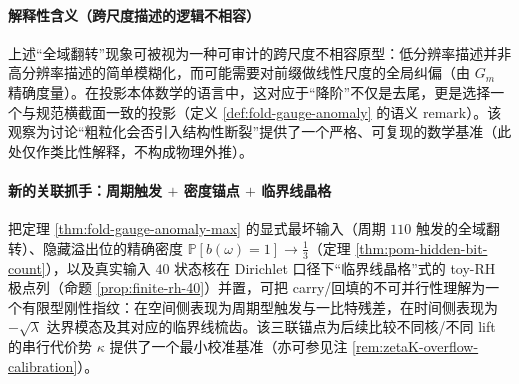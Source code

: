 \paragraph{解释性含义（跨尺度描述的逻辑不相容）}
上述“全域翻转”现象可被视为一种可审计的跨尺度不相容原型：低分辨率描述并非高分辨率描述的简单模糊化，而可能需要对前缀做线性尺度的全局纠偏（由 \(G_m\) 精确度量）。在投影本体数学的语言中，这对应于“降阶”不仅是去尾，更是选择一个与规范横截面一致的投影（定义 \ref{def:fold-gauge-anomaly} 的语义 remark）。该观察为讨论“粗粒化会否引入结构性断裂”提供了一个严格、可复现的数学基准（此处仅作类比性解释，不构成物理外推）。

\paragraph{新的关联抓手：周期触发 \texorpdfstring{$+$}{+} 密度锚点 \texorpdfstring{$+$}{+} 临界线晶格}
把定理 \ref{thm:fold-gauge-anomaly-max} 的显式最坏输入（周期 \(110\) 触发的全域翻转）、隐藏溢出位的精确密度 \(\mathbb{P}[b(\omega)=1]\to \frac13\)（定理 \ref{thm:pom-hidden-bit-count}），以及真实输入 \(40\) 状态核在 Dirichlet 口径下“临界线晶格”式的 toy-RH 极点列（命题 \ref{prop:finite-rh-40}）并置，可把 carry/回填的不可并行性理解为一个有限型刚性指纹：在空间侧表现为周期型触发与一比特残差，在时间侧表现为 \(-\sqrt\lambda\) 达界模态及其对应的临界线梳齿。该三联锚点为后续比较不同核/不同 lift 的串行代价势 \(\kappa\) 提供了一个最小校准基准（亦可参见注 \ref{rem:zetaK-overflow-calibration}）。

